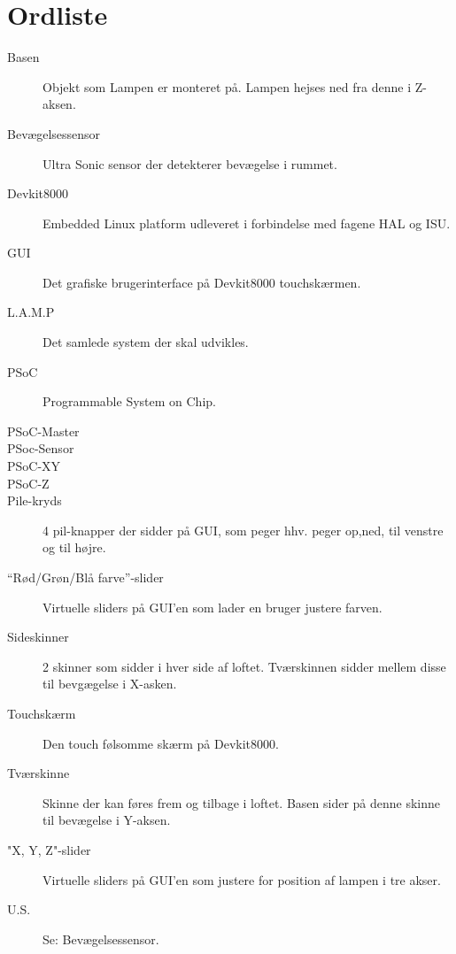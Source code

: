 \chapter{Ordliste}

\begin{description}
    \item [Basen] Objekt som Lampen er monteret på. Lampen hejses ned fra denne i Z-aksen.
    \item [Bevægelsessensor] Ultra Sonic sensor der detekterer bevægelse i rummet.
    \item [Devkit8000] Embedded Linux platform udleveret i forbindelse med fagene HAL og ISU.
    \item [GUI] Det grafiske brugerinterface på Devkit8000 touchskærmen.
    \item [L.A.M.P] Det samlede system der skal udvikles.
    \item [PSoC] Programmable System on Chip.
    \item [PSoC-Master] 
    \item [PSoc-Sensor] 
    \item [PSoC-XY] 
    \item [PSoC-Z] 
    \item [Pile-kryds] 4 pil-knapper der sidder på GUI, som peger hhv. peger op,ned, til venstre og til højre.
    \item [“Rød/Grøn/Blå farve”-slider] Virtuelle sliders på GUI’en som lader en bruger justere farven.
    \item [Sideskinner] 2 skinner som sidder i hver side af loftet. Tværskinnen sidder mellem disse til bevgægelse i X-asken.
    \item [Touchskærm] Den touch følsomme skærm på Devkit8000.
    \item [Tværskinne] Skinne der kan føres frem og tilbage i loftet. Basen sider på denne skinne til bevægelse i Y-aksen.
    \item ["X, Y, Z"-slider] Virtuelle sliders på GUI'en som justere for position af lampen i tre akser.
    \item [U.S.] Se: Bevægelsessensor.
\end{description}
